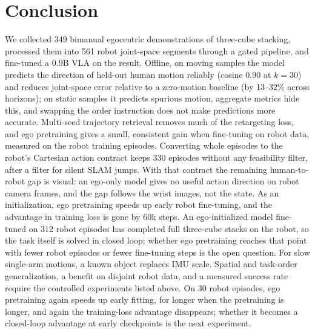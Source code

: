 \documentclass[conference,10pt]{IEEEtran}
\newcounter{rpart}
\newcommand{\reportpart}[3]{\clearpage\stepcounter{rpart}\setcounter{section}{0}%
  \twocolumn[{\centering{\LARGE\bfseries #1\par}\vspace{1.5mm}{\large #2\par}\vspace{3mm}\hrule\vspace{5mm}}]\label{#3}}
\begin{document}
\section{Conclusion}
We collected 349 bimanual egocentric demonstrations of three-cube stacking, processed them into 561 robot joint-space segments
through a gated pipeline, and fine-tuned a 0.9B VLA on the result. Offline, on moving samples the model predicts the
direction of held-out human motion reliably (cosine 0.90 at $k{=}30$) and reduces joint-space error relative to a zero-motion
baseline (by 13--32\% across horizons); on static samples it predicts spurious motion, aggregate metrics hide this, and
swapping the order instruction does not make predictions more accurate. Multi-seed trajectory retrieval removes much of the
retargeting loss, and ego pretraining gives a small, consistent gain when fine-tuning on robot data, measured on the robot
training episodes. Converting whole episodes to the robot's Cartesian action contract keeps 330 episodes without any
feasibility filter, after a filter for silent SLAM jumps. With that contract the remaining human-to-robot gap is visual: an
ego-only model gives no useful action direction on robot camera frames, and the gap follows the wrist images, not the state.
As an initialization, ego pretraining speeds up early robot fine-tuning, and the advantage in training loss is gone by
60k steps. An ego-initialized model fine-tuned on 312 robot episodes has completed full three-cube stacks on the robot, so
the task itself is solved in closed loop; whether ego pretraining reaches that point with fewer robot episodes or fewer
fine-tuning steps is the open question. For slow single-arm motions, a known object replaces IMU scale. Spatial and
task-order generalization, a benefit on disjoint robot data, and a measured success rate require the controlled
experiments listed above. On 30 robot episodes, ego pretraining again speeds up early fitting, for longer when the
pretraining is longer, and again the training-loss advantage disappears; whether it becomes a closed-loop advantage at early
checkpoints is the next experiment.
\reportpart{Part II}{Single-Arm Approach to a Cube}{part:p2}
\end{document}
